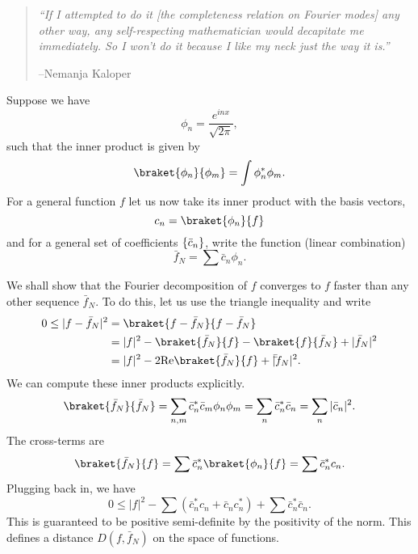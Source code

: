 \begin{quote}
    \textit{``If I attempted to do it [the completeness relation on Fourier modes] any other way, any self-respecting mathematician would decapitate me immediately. So I won't do it because I like my neck just the way it is.''}
    
    --Nemanja Kaloper
\end{quote}
Suppose we have
\begin{equation}
    \phi_n = \frac{e^{inx}}{\sqrt{2\pi}},
\end{equation}
such that the inner product is given by
\begin{equation}
    \braket{\phi_n}{\phi_m} = \int \phi_n^* \phi_m.
\end{equation}
For a general function $f$ let us now take its inner product with the basis vectors,
\begin{equation}
    c_n = \braket{\phi_n}{f}
\end{equation}
and for a general set of coefficients $\{\bar c_n\}$, write the function (linear combination)
\begin{equation}
    \bar f_N = \sum \bar c_n \phi_n.
\end{equation}

We shall show that the Fourier decomposition of $f$ converges to $f$ faster than any other sequence $\bar f_N$. To do this, let us use the triangle inequality and write
\begin{align}
    0 \leq |f - \bar f_N|^2 &= \braket{f-\bar f_N}{f-\bar f_N}\\
        &= |f|^2 -\braket{\bar f_N}{f} -\braket{f}{\bar f_N} +|\bar f_N|^2\\
        &=|f|^2 -2\text{Re}\braket{\bar f_N}{f} +|\bar \bar f_N|^2.
\end{align}
We can compute these inner products explicitly.
\begin{equation}
    \braket{\bar f_N}{\bar f_N} = \sum_{n,m} \bar c_n^* \bar c_m \phi_n \phi_m = \sum_n \bar c_n^* \bar c_n = \sum_n |\bar c_n|^2.
\end{equation}
The cross-terms are
\begin{equation}
    \braket{\bar f_N}{f} = \sum \bar c_n^* \braket{\phi_n}{f}  = \sum \bar c_n^* c_n.
\end{equation}
Plugging back in, we have
\begin{equation}
    0 \leq |f|^2 - \sum(\bar c_n^* c_n + \bar c_n c_n^*) + \sum \bar c_n^* \bar c_n.
\end{equation}
This is guaranteed to be positive semi-definite by the positivity of the norm. This defines a distance $D(f,\bar f_N)$ on the space of functions.

